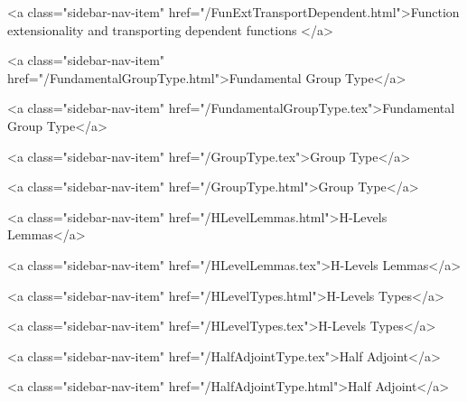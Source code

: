      
        
          <a class="sidebar-nav-item" href="/FunExtTransportDependent.html">Function extensionality and transporting dependent functions </a>
        
      
    
      
        
          <a class="sidebar-nav-item" href="/FundamentalGroupType.html">Fundamental Group Type</a>
        
      
    
      
        
          <a class="sidebar-nav-item" href="/FundamentalGroupType.tex">Fundamental Group Type</a>
        
      
    
      
        
          <a class="sidebar-nav-item" href="/GroupType.tex">Group Type</a>
        
      
    
      
        
          <a class="sidebar-nav-item" href="/GroupType.html">Group Type</a>
        
      
    
      
        
          <a class="sidebar-nav-item" href="/HLevelLemmas.html">H-Levels Lemmas</a>
        
      
    
      
        
          <a class="sidebar-nav-item" href="/HLevelLemmas.tex">H-Levels Lemmas</a>
        
      
    
      
        
          <a class="sidebar-nav-item" href="/HLevelTypes.html">H-Levels Types</a>
        
      
    
      
        
          <a class="sidebar-nav-item" href="/HLevelTypes.tex">H-Levels Types</a>
        
      
    
      
        
          <a class="sidebar-nav-item" href="/HalfAdjointType.tex">Half Adjoint</a>
        
      
    
      
        
          <a class="sidebar-nav-item" href="/HalfAdjointType.html">Half Adjoint</a>
        
